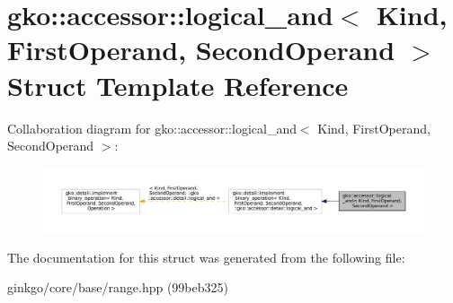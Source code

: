 \hypertarget{structgko_1_1accessor_1_1logical__and}{}\section{gko\+:\+:accessor\+:\+:logical\+\_\+and$<$ Kind, First\+Operand, Second\+Operand $>$ Struct Template Reference}
\label{structgko_1_1accessor_1_1logical__and}


Collaboration diagram for gko\+:\+:accessor\+:\+:logical\+\_\+and$<$ Kind, First\+Operand, Second\+Operand $>$\+:
\nopagebreak
\begin{figure}[H]
\begin{center}
\leavevmode
\includegraphics[width=350pt]{structgko_1_1accessor_1_1logical__and__coll__graph}
\end{center}
\end{figure}


The documentation for this struct was generated from the following file\+:\begin{DoxyCompactItemize}
\item 
ginkgo/core/base/range.\+hpp (99beb325)\end{DoxyCompactItemize}

